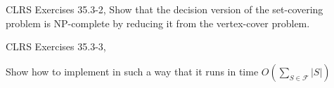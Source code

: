 

\usepackage{clrscode}
\usepackage{enumerate}
\newcommand{\hmwkTitle}{Assignment\ \#7} %
\newcommand{\hmwkDueDate}{April\ 30,\ 2016} %
\newcommand{\hmwkClass}{Algorithms} %
\newcommand{\hmwkAuthorName}{Zhaoyang Li (2014013432)} %



\maketitle


\setcounter{tocdepth}{1} %

\newpage
\tableofcontents
\newpage



\begin{homeworkProblem}

CLRS Exercises 35.3-2, 
Show that the decision version of the set-covering problem is NP-complete by reducing it from the vertex-cover problem.

\problemAnswer{


}
\end{homeworkProblem}




\begin{homeworkProblem}

CLRS Exercises 35.3-3, 

Show how to implement  in such a way that it runs in time $O\left(\sum_{S\in \mathcal{F}}|S|\right)$


\problemAnswer{
}
\end{homeworkProblem}



